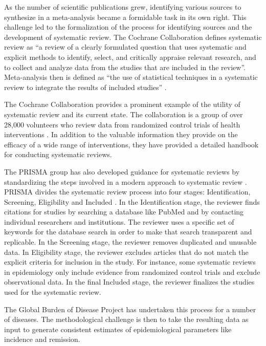 As the number of scientific publications grew, identifying various
sources to synthesize in a meta-analysis became a formidable task in
its own right. This challenge led to the formalization of the process
for identifying sources and the development of systematic review. The
Cochrane Collaboration defines systematic review as ``a review of a
clearly formulated question that uses systematic and explicit methods
to identify, select, and critically appraise relevant research, and to
collect and analyze data from the studies that are included in the
review''. Meta-analysis then is defined as ``the use of statistical
techniques in a systematic review to integrate the results of included
studies'' \cite{Green_Systematic_2005}.

The Cochrane Collaboration provides a prominent example of the utility
of systematic review and its current state. The collaboration is a
group of over 28,000 volunteers who review data from randomized
control trials of health interventions
\cite{Cochrane_Cochrane_2012}. In addition to the valuable information
they provide on the efficacy of a wide range of interventions, they
have provided a detailed handbook for conducting systematic
reviews.

The PRISMA group has also developed guidance for systematic reviews by
standardizing the steps involved in a modern approach to systematic
review \cite{Liberati_PRISMA_2009}. PRISMA divides the systematic
review process into four stages: Identification, Screening,
Eligibility and Included \cite{Green_Systematic_2005}.  In the
Identification stage, the reviewer finds citations for studies by
searching a database like PubMed and by contacting individual
researchers and institutions. The reviewer uses a specific set of
keywords for the database search in order to make that search
transparent and replicable. In the Screening stage, the reviewer
removes duplicated and unusable data. In Eligibility stage, the
reviewer excludes articles that do not match the explicit criteria for
inclusion in the study. For instance, some systematic reviews in
epidemiology only include evidence from randomized control trials and
exclude observational data. In the final Included stage, the reviewer
finalizes the studies used for the systematic review.

The Global Burden of Disease Project has undertaken this process for a
number of diseases. The methodological challenge is then to take the
resulting data as input to generate consistent estimates of
epidemiological parameters like incidence and remission.

